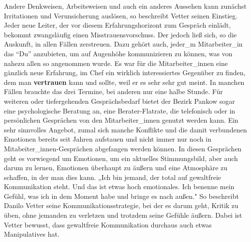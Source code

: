 \documentclass[a4paper,
fontsize=11pt,
oneside,
numbers=noperiodatend,
parskip=half-,
bibliography=totoc,
final
]{scrartcl}
\begin{document}
Andere Denkweisen, Arbeitsweisen und auch ein anderes Aussehen kann
zunächst Irritationen und Verunsicherung auslösen, so beschreibt Vetter
seinen Einstieg. Jeder neue Leiter, der vor diesem Erfahrungshorizont
zum Gespräch einlädt, bekommt zwangsläufig einen Misstrauensvorschuss.
Der jedoch ließ sich, so die Auskunft, in allen Fällen zerstreuen. Dazu
gehört auch, jeder\_m Mitarbeiter\_in das \enquote{Du} anzubieten, um
auf Augenhöhe kommunizieren zu können, was von nahezu allen so
angenommen wurde. Es war für die Mitarbeiter\_innen eine gänzlich neue
Erfahrung, im Chef ein wirklich interessiertes Gegenüber zu finden, dem
man \textbf{vertrauen} kann und sollte, weil er es sehr sehr gut meint.
In manchen Fällen brauchte das drei Termine, bei anderen nur eine halbe
Stunde. Für weiteren oder tiefergehenden Gesprächsbedarf bietet der
Bezirk Pankow sogar eine psychologische Beratung an, eine
Berater-Flatrate, die telefonisch oder in persönlichen Gesprächen von
den Mitarbeiter\_innen genutzt werden kann. Ein sehr sinnvolles Angebot,
zumal sich manche Konflikte und die damit verbundenen Emotionen bereits
seit Jahren aufstauen und nicht immer nur noch in
Mitabeiter\_innen-Gesprächen abgefangen werden können. In diesen
Gesprächen geht es vorwiegend um Emotionen, um ein aktuelles
Stimmungsbild, aber auch darum zu lernen, Emotionen überhaupt zu äußern
und eine Atmosphäre zu schaffen, in der man dies kann. „Ich bin jemand,
der total auf gewaltfreie Kommunikation steht. Und das ist etwas hoch
emotionales. Ich benenne mein Gefühl, was ich in dem Moment habe und
bringe es nach außen." So beschreibt Danilo Vetter seine
Kommunikationsstrategie, bei der es darum geht, Kritik zu üben, ohne
jemanden zu verletzen und trotzdem seine Gefühle äußern. Dabei ist
Vetter bewusst, dass gewaltfreie Kommunikation durchaus auch etwas
Manipulatives hat.
\end{document}
